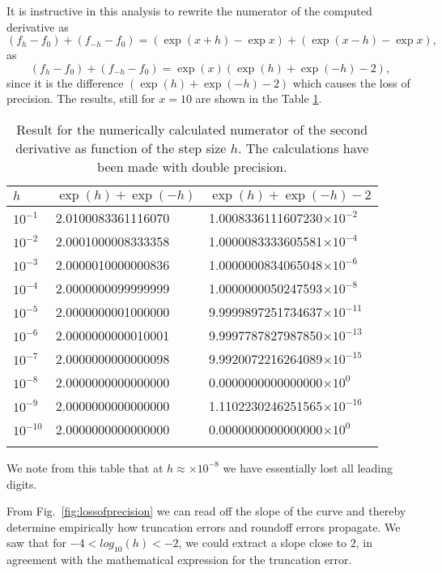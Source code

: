 It is instructive in this analysis to rewrite the numerator of
the computed derivative as
\[
   (f_h -f_0) +(f_{-h}-f_0)=(\exp{(x+h)}-\exp{x}) + (\exp{(x-h)}-\exp{x}),
\]
as
\[
   (f_h -f_0) +(f_{-h}-f_0)=\exp{(x)}(\exp{(h)}+\exp{(-h)}-2),
\]
since it is the difference $(\exp{(h)}+\exp{(-h)}-2)$ which causes
the loss of precision.
The results, still for $x=10$ are shown in the Table
\ref{tab:subcancellation}.
\begin{table}[hbtp]
\begin{center}
\begin{tabular}{lll}\hline
$h$&$\exp{(h)}+\exp{(-h)}$ & $\exp{(h)}+\exp{(-h)}-2$\\\hline
 $10^{-1}$ & 2.0100083361116070 &  1.0008336111607230$\times 10^{-2}$ \\
 $10^{-2}$ & 2.0001000008333358 &  1.0000083333605581$\times 10^{-4}$ \\
 $10^{-3}$ & 2.0000010000000836 &  1.0000000834065048$\times 10^{-6}$ \\
 $10^{-4}$ & 2.0000000099999999 &  1.0000000050247593$\times 10^{-8}$ \\
 $10^{-5}$ & 2.0000000001000000 &  9.9999897251734637$\times 10^{-11}$  \\
 $10^{-6}$ & 2.0000000000010001 &  9.9997787827987850$\times 10^{-13}$  \\
 $10^{-7}$ & 2.0000000000000098 &  9.9920072216264089$\times 10^{-15}$  \\
 $10^{-8}$ & 2.0000000000000000 &  0.0000000000000000$\times 10^{0}$ \\
 $10^{-9}$ & 2.0000000000000000 &  1.1102230246251565$\times 10^{-16}$  \\
 $10^{-10}$  & 2.0000000000000000 &  0.0000000000000000$\times 10^{0}$ \\
&&\\\hline
\end{tabular} 
\caption{Result  for the numerically calculated numerator of the second derivative  
         as function of the step size $h$. The calculations have been made
with double precision.\label{tab:subcancellation}}
\end{center}   
\end{table}     
We note from this table that at $h\approx \times 10^{-8}$ we have
essentially lost all leading digits.

 From  Fig.~\ref{fig:lossofprecision}
we can read off  the slope of the curve and thereby determine 
empirically how truncation errors and roundoff errors propagate.
We saw that for  $-4 < log_{10}(h) < -2$, we could extract a slope
close to $2$, in agreement with the mathematical expression
for the truncation error.
 
